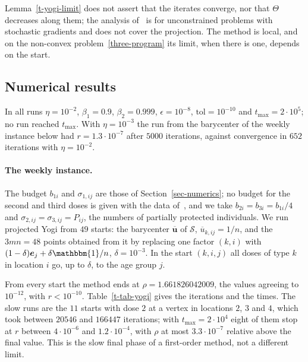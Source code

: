 \documentclass[11pt]{article}
\theoremstyle{plain}
\theoremstyle{definition}
\theoremstyle{remark}
\numberwithin{equation}{section}
\numberwithin{figure}{section}
\numberwithin{table}{section}
\begin{document}
Lemma~\ref{t-yogi-limit} does not assert that the iterates converge, nor
that $\Theta$ decreases along them; the analysis of~\cite{2018Zaheer_Yogi} is
for unconstrained problems with stochastic gradients and does not cover the
projection. The method is local, and on the non-convex
problem~\eqref{three-program} its limit, when there is one, depends on the
start.

\subsection{Numerical results}\label{sec-three-numerics}

In all runs $\eta=10^{-2}$, $\beta_1=0.9$, $\beta_2=0.999$,
$\epsilon=10^{-8}$, $\mathrm{tol}=10^{-10}$ and $t_{\max}=2\cdot 10^5$; no run
reached $t_{\max}$. With $\eta=10^{-3}$ the run from the barycenter of the
weekly instance below had $r=1.3\cdot 10^{-7}$ after $5000$ iterations,
against convergence in $652$ iterations with $\eta=10^{-2}$.

\paragraph{The weekly instance.} The budget $b_{1i}$ and $\sigma_{1,ij}$ are
those of Section~\ref{sec-numerics}; no budget for the second and third doses
is given with the data of~\cite{JZh}, and we take $b_{2i}=b_{3i}=b_{1i}/4$ and
$\sigma_{2,ij}=\sigma_{3,ij}=P_{ij}$, the numbers of partially protected
individuals. We run projected Yogi from $49$ starts: the
barycenter $\overline{\bm u}$ of $\mathcal{S}$, $\overline u_{k,ij}=1/n$, and
the $3mn=48$ points obtained from it by replacing one factor $(k,i)$ with
$(1-\delta)\bm e_j+\delta\mathbbm{1}/n$, $\delta=10^{-3}$. In the start
$(k,i,j)$ all doses of type $k$ in location $i$ go, up to $\delta$, to the age
group $j$.

From every start the method ends at $\rho=1.661826042009$, the values agreeing
to $10^{-12}$, with $r<10^{-10}$. Table~\ref{t-tab-yogi} gives the iterations
and the times. The slow runs are the $11$ starts with dose $2$ at a vertex in
locations $2$, $3$ and $4$, which took between $20546$ and $166447$
iterations; with $t_{\max}=2\cdot 10^4$ eight of them stop at $r$ between
$4\cdot 10^{-6}$ and $1.2\cdot 10^{-4}$, with $\rho$ at most
$3.3\cdot 10^{-7}$ relative above the final value. This is the slow final
phase of a first-order method, not a different limit.
\end{document}
